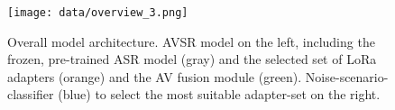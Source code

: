 \begin{figure}[t]
  \centering
  \texttt{[image: data/overview\_3.png]}
  \caption{Overall model architecture. AVSR model on the left, including the frozen, pre-trained ASR model (gray) and the selected set of LoRa adapters (orange) and the AV fusion module (green). Noise-scenario-classifier (blue) to select the most suitable adapter-set on the right.}
  \label{fig:overview_model}
\end{figure}